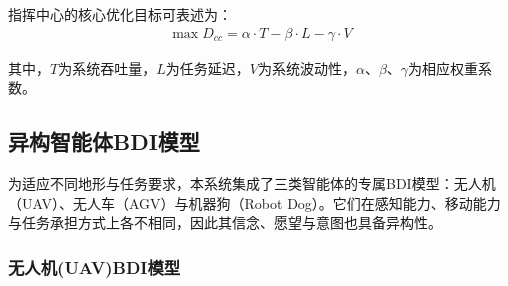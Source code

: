 \documentclass[12pt,a4paper]{article}
\begin{document}
指挥中心的核心优化目标可表述为：
\begin{align}
\max D_{cc} = \alpha \cdot T - \beta \cdot L - \gamma \cdot V
\end{align}

其中，$T$为系统吞吐量，$L$为任务延迟，$V$为系统波动性，$\alpha$、$\beta$、$\gamma$为相应权重系数。

\subsection{异构智能体BDI模型}

为适应不同地形与任务要求，本系统集成了三类智能体的专属BDI模型：无人机（UAV）、无人车（AGV）与机器狗（Robot Dog）。它们在感知能力、移动能力与任务承担方式上各不相同，因此其信念、愿望与意图也具备异构性。

\subsubsection{无人机(UAV)BDI模型}
\end{document}
